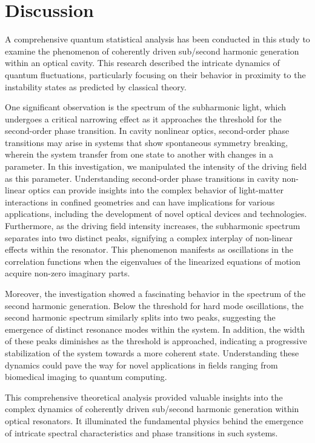 \documentclass[fleqn,11pt]{wlscirep}
\begin{document}
\section*{Discussion}

A comprehensive quantum statistical analysis has been conducted in this study to examine the phenomenon of coherently driven sub/second harmonic generation within an optical cavity. This research described the intricate dynamics of quantum fluctuations, particularly focusing on their behavior in proximity to the instability states as predicted by classical theory.

One significant observation is the spectrum of the subharmonic light, which undergoes a critical narrowing effect as it approaches the threshold for the second-order phase transition. In cavity nonlinear optics, second-order phase transitions may arise in systems that show spontaneous symmetry breaking, wherein the system transfer from one state to another with changes in a parameter. In this investigation, we manipulated the intensity of the driving field as this parameter. Understanding second-order phase transitions in cavity non-linear optics can provide insights into the complex behavior of light-matter interactions in confined geometries and can have implications for various applications, including the development of novel optical devices and technologies.
Furthermore, as the driving field intensity increases, the subharmonic spectrum separates into two distinct peaks, signifying a complex interplay of non-linear effects within the resonator. This phenomenon manifests as oscillations in the correlation functions when the eigenvalues of the linearized equations of motion acquire non-zero imaginary parts.

Moreover, the investigation showed a fascinating behavior in the spectrum of the second harmonic generation. Below the threshold for hard mode oscillations, the second harmonic spectrum similarly splits into two peaks, suggesting the emergence of distinct resonance modes within the system. In addition, the width of these peaks diminishes as the threshold is approached, indicating a progressive stabilization of the system towards a more coherent state. Understanding these dynamics could pave the way for novel applications in fields ranging from biomedical imaging to quantum computing.

This comprehensive theoretical analysis provided valuable insights into the complex dynamics of coherently driven sub/second harmonic generation within optical resonators. It illuminated the fundamental physics behind the emergence of intricate spectral characteristics and phase transitions in such systems.



\end{document}
